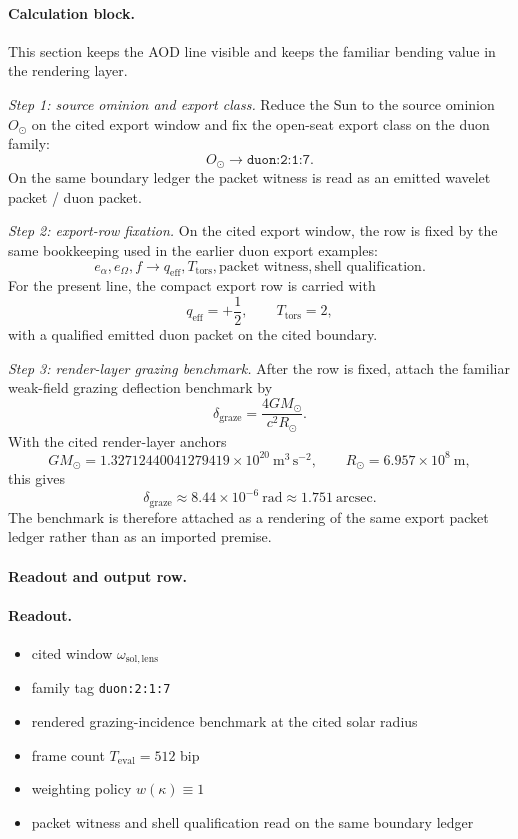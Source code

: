 \paragraph{Calculation block.} This section keeps the AOD line visible and keeps the familiar bending value in the rendering layer.

\textit{Step 1: source ominion and export class.} Reduce the Sun to the source ominion $O_\odot$ on the cited export window and fix the open-seat export class on the duon family:
\[
O_\odot \longrightarrow \texttt{duon:2:1:7}.
\]
On the same boundary ledger the packet witness is read as an emitted wavelet packet / duon packet.

\textit{Step 2: export-row fixation.} On the cited export window, the row is fixed by the same bookkeeping used in the earlier duon export examples:
\[
e_\alpha,e_\Omega,f \longrightarrow q_{\mathrm{eff}}, T_{\mathrm{tors}}, \text{packet witness}, \text{shell qualification}.
\]
For the present line, the compact export row is carried with
\[
q_{\mathrm{eff}} = +\frac{1}{2},\qquad T_{\mathrm{tors}} = 2,
\]
with a qualified emitted duon packet on the cited boundary.

\textit{Step 3: render-layer grazing benchmark.} After the row is fixed, attach the familiar weak-field grazing deflection benchmark by
\[
\delta_{\mathrm{graze}} = \frac{4GM_\odot}{c^2 R_\odot}.
\]
With the cited render-layer anchors
\[
GM_\odot = 1.32712440041279419\times 10^{20}\ \mathrm{m^3\,s^{-2}},\qquad R_\odot = 6.957\times 10^8\ \mathrm{m},
\]
this gives
\[
\delta_{\mathrm{graze}} \approx 8.44\times 10^{-6}\ \mathrm{rad} \approx 1.751\ \mathrm{arcsec}.
\]
The benchmark is therefore attached as a rendering of the same export packet ledger rather than as an imported premise.

\paragraph{Readout and output row.}
\paragraph{Readout.}
\begin{itemize}
\item cited window $\omega_{\mathrm{sol,lens}}$
\item family tag \texttt{duon:2:1:7}
\item rendered grazing-incidence benchmark at the cited solar radius
\item frame count $T_{\mathrm{eval}} = 512$ bip
\item weighting policy $w(\kappa)\equiv 1$
\item packet witness and shell qualification read on the same boundary ledger
\end{itemize}

